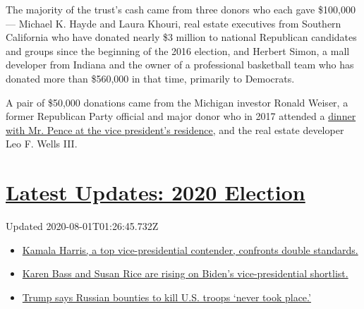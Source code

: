The majority of the trust's cash came from three donors who each gave
\$100,000 --- Michael K. Hayde and Laura Khouri, real estate executives
from Southern California who have donated nearly \$3 million to national
Republican candidates and groups since the beginning of the 2016
election, and Herbert Simon, a mall developer from Indiana and the owner
of a professional basketball team who has donated more than \$560,000 in
that time, primarily to Democrats.

A pair of \$50,000 donations came from the Michigan investor Ronald
Weiser, a former Republican Party official and major donor who in 2017
attended a
\href{https://www.nytimes.com/2017/07/09/us/politics/at-private-dinners-pence-quietly-courts-big-donors-and-corporate-executives.html}{dinner
with Mr. Pence at the vice president's residence}, and the real estate
developer Leo F. Wells III.

\hypertarget{latest-updates-2020-election}{%
\section{\texorpdfstring{\href{https://www.nytimes.com/2020/07/31/us/elections/biden-vs-trump.html?action=click\&pgtype=Article\&state=default\&region=MAIN_CONTENT_1\&context=storylines_live_updates}{Latest
Updates: 2020
Election}}{Latest Updates: 2020 Election}}\label{latest-updates-2020-election}}

Updated 2020-08-01T01:26:45.732Z

\begin{itemize}
\tightlist
\item
  \href{https://www.nytimes.com/2020/07/31/us/elections/biden-vs-trump.html?action=click\&pgtype=Article\&state=default\&region=MAIN_CONTENT_1\&context=storylines_live_updates\#link-29fdff45}{Kamala
  Harris, a top vice-presidential contender, confronts double
  standards.}
\item
  \href{https://www.nytimes.com/2020/07/31/us/elections/biden-vs-trump.html?action=click\&pgtype=Article\&state=default\&region=MAIN_CONTENT_1\&context=storylines_live_updates\#link-13ec3d9c}{Karen
  Bass and Susan Rice are rising on Biden's vice-presidential
  shortlist.}
\item
  \href{https://www.nytimes.com/2020/07/31/us/elections/biden-vs-trump.html?action=click\&pgtype=Article\&state=default\&region=MAIN_CONTENT_1\&context=storylines_live_updates\#link-49e9a016}{Trump
  says Russian bounties to kill U.S. troops `never took place.'}
\end{itemize}

